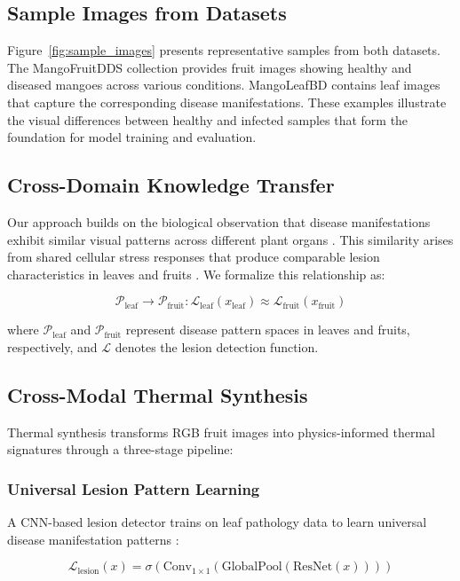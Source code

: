 \documentclass[utf8]{FrontiersinHarvard} %
\begin{document}
\subsection{Sample Images from Datasets}
Figure~\ref{fig:sample_images} presents representative samples from both datasets. The MangoFruitDDS collection provides fruit images showing healthy and diseased mangoes across various conditions. MangoLeafBD contains leaf images that capture the corresponding disease manifestations. These examples illustrate the visual differences between healthy and infected samples that form the foundation for model training and evaluation.

\subsection{Cross-Domain Knowledge Transfer}
Our approach builds on the biological observation that disease manifestations exhibit similar visual patterns across different plant organs \cite{bock2010}. This similarity arises from shared cellular stress responses that produce comparable lesion characteristics in leaves and fruits \cite{savary2019}. We formalize this relationship as:

\begin{equation}
    \mathcal{P}_{\text{leaf}} \rightarrow \mathcal{P}_{\text{fruit}} : \mathcal{L}_{\text{leaf}}(x_{\text{leaf}}) \approx \mathcal{L}_{\text{fruit}}(x_{\text{fruit}})
    \label{eq:cross_domain}
\end{equation}

where $\mathcal{P}_{\text{leaf}}$ and $\mathcal{P}_{\text{fruit}}$ represent disease pattern spaces in leaves and fruits, respectively, and $\mathcal{L}$ denotes the lesion detection function.

\subsection{Cross-Modal Thermal Synthesis}
Thermal synthesis transforms RGB fruit images into physics-informed thermal signatures through a three-stage pipeline:

\subsubsection{Universal Lesion Pattern Learning}
A CNN-based lesion detector trains on leaf pathology data to learn universal disease manifestation patterns \cite{he2016}:

\begin{equation}
    \mathcal{L}_{\text{lesion}}(x) = \sigma(\text{Conv}_{1\times 1}(\text{GlobalPool}(\text{ResNet}(x))))
    \label{eq:lesion_detector}
\end{equation}
\end{document}
